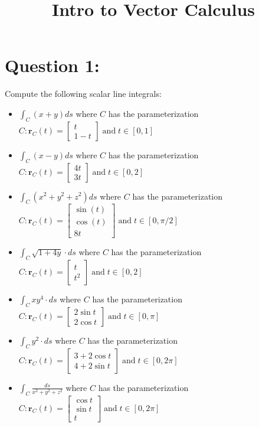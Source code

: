\documentclass{article}
\title{Intro to Vector Calculus}
\date{}
\begin{document}
\maketitle

\section*{Question 1:}

Compute the following scalar line integrals:

\begin{itemize}
\item \(\int_C (x + y)ds\) where \(C\) has the parameterization \(C: \mathbf{r}_C(t) = \begin{bmatrix} t \\ 1 - t \end{bmatrix} \;\text{and}\; t \in [0,1]\)
\item \(\int_C (x - y)ds\) where \(C\) has the parameterization \(C: \mathbf{r}_C(t) = \begin{bmatrix} 4t \\ 3t \end{bmatrix} \;\text{and}\; t \in [0,2]\)
\item \(\int_C (x^2 + y^2 + z^2)ds\) where \(C\) has the parameterization \(C: \mathbf{r}_C(t) = \begin{bmatrix} \sin(t) \\ \cos(t) \\ 8t \end{bmatrix} \;\text{and}\; t \in [0,\pi/2]\)
\item \(\int_C \sqrt{1 + 4y} \cdot ds\) where \(C\) has the parameterization \(C: \mathbf{r}_C(t) = \begin{bmatrix} t \\ t^2 \end{bmatrix} \;\text{and}\; t \in [0,2]\)
\item \(\int_C xy^4 \cdot ds\) where \(C\) has the parameterization \(C: \mathbf{r}_C(t) = \begin{bmatrix} 2\sin t \\ 2\cos t \end{bmatrix} \;\text{and}\; t \in [0,\pi]\)
\item \(\int_C y^2 \cdot ds\) where \(C\) has the parameterization \(C: \mathbf{r}_C(t) = \begin{bmatrix} 3 + 2\cos t \\ 4 + 2\sin t \end{bmatrix} \;\text{and}\; t \in [0,2\pi]\)
\item \(\int_C \frac{ds}{x^2 + y^2 + z^2}\) where \(C\) has the parameterization \(C: \mathbf{r}_C(t) = \begin{bmatrix} \cos t \\ \sin t \\ t \end{bmatrix} \;\text{and}\; t \in [0,2\pi]\)
\end{itemize}
\end{document}

